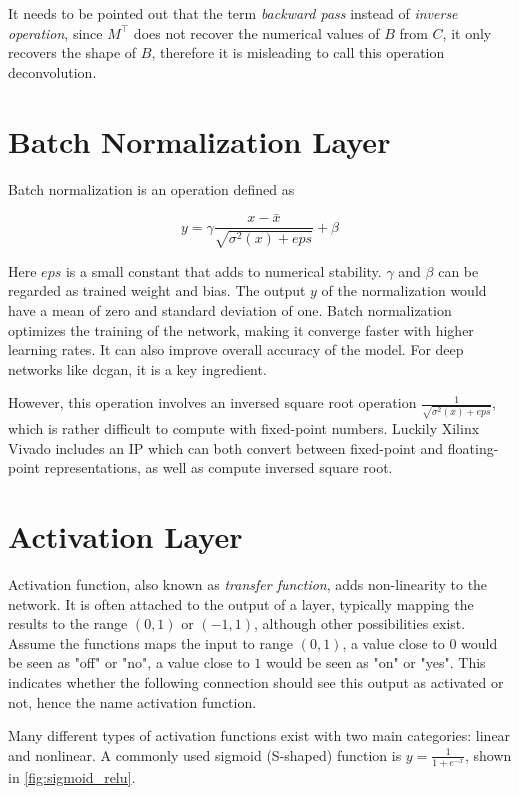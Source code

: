 It needs to be pointed out that the term \textit{backward pass} instead of \textit{inverse operation},
since $M^\intercal$ does not recover the numerical values of $B$ from $C$, it only recovers the shape of $B$,
therefore it is misleading to call this operation deconvolution.

\section{Batch Normalization Layer}

Batch normalization is an operation defined as

\begin{equation} \label{eq:batch_normalization}
  y = \gamma \frac{x - \bar{x}}{\sqrt{\sigma^2(x) + {eps}}} + \beta
\end{equation}

Here $eps$ is a small constant that adds to numerical stability. $\gamma$ and $\beta$ can be regarded
as trained weight and bias. The output $y$ of the normalization would have a mean of zero and standard
deviation of one. Batch normalization optimizes the training of the network, making it converge
faster with higher learning rates. It can also improve overall accuracy of the model. For deep networks
like \gls{dcgan}, it is a key ingredient.

However, this operation involves an inversed square root operation $\frac{1}{\sqrt{\sigma^2(x) + eps}}$,
which is rather difficult to compute with fixed-point numbers. Luckily Xilinx Vivado includes an IP which
can both convert between fixed-point and floating-point representations, as well as compute inversed square
root.

\section{Activation Layer}

Activation function, also known as \textit{transfer function}, adds non-linearity to the network. It is often
attached to the output of a layer, typically mapping the results to the range $(0, 1)$ or $(-1, 1)$, although
other possibilities exist. Assume the functions maps the input to range $(0, 1)$, a value close to $0$ would
be seen as "off" or "no", a value close to $1$ would be seen as "on" or "yes". This indicates whether the
following connection should see this output as activated or not, hence the name activation function.

Many different types of activation functions exist with two main categories: linear and nonlinear. A commonly
used sigmoid (S-shaped) function is $y = \frac{1}{1 + e^{-x}}$, shown in \ref{fig:sigmoid_relu}.

